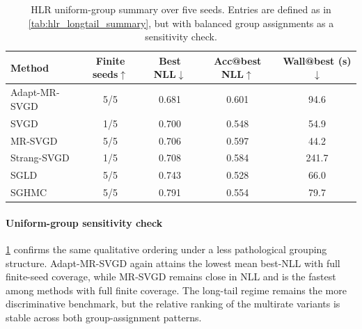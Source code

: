 \begin{table}[t]
  \centering
  \scriptsize
  \setlength{\tabcolsep}{4pt}
  \begin{tabular}{lcccc}
    \toprule
    Method & Finite seeds$\uparrow$ & Best NLL$\downarrow$ & Acc@best NLL$\uparrow$ & Wall@best (s)$\downarrow$ \\
    \midrule
    Adapt-MR-SVGD & 5/5 & 0.681 & 0.601 & 94.6 \\
    SVGD & 1/5 & 0.700 & 0.548 & 54.9 \\
    MR-SVGD & 5/5 & 0.706 & 0.597 & 44.2 \\
    Strang-SVGD & 1/5 & 0.708 & 0.584 & 241.7 \\
    SGLD & 5/5 & 0.743 & 0.528 & 66.0 \\
    SGHMC & 5/5 & 0.791 & 0.554 & 79.7 \\
    \bottomrule
  \end{tabular}
  \caption{HLR uniform-group summary over five seeds. Entries are defined as in
  \cref{tab:hlr_longtail_summary}, but with balanced group assignments as a
  sensitivity check.}
  \label{tab:hlr_uniform_summary}
\end{table}

\paragraph{Uniform-group sensitivity check}
\cref{tab:hlr_uniform_summary} confirms the same qualitative ordering under a
less pathological grouping structure. Adapt-MR-SVGD again attains the lowest
mean best-NLL with full finite-seed coverage, while MR-SVGD remains close in
NLL and is the fastest among methods with full finite coverage. The long-tail
regime remains the more discriminative benchmark, but the relative ranking of
the multirate variants is stable across both group-assignment patterns.
